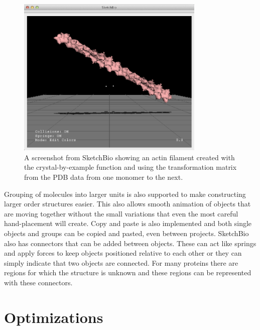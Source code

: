 \documentclass{article} %
\begin{document}
\begin{figure}[h]
\centering
\includegraphics[width=0.8\textwidth]{crystal_actin.png}
\caption{A screenshot from SketchBio showing an actin filament created with the crystal-by-example function and using the transformation matrix from the PDB data from one monomer to the next.}
\label{fig:crystal_actin}
\end{figure}

Grouping of molecules into larger units is also supported to make constructing larger order structures easier.  This also allows smooth animation of objects that are moving together without the small variations that even the most careful hand-placement will create.  Copy and paste is also implemented and both single objects and groups can be copied and pasted, even between projects.  SketchBio also has connectors that can be added between objects.  These can act like springs and apply forces to keep objects positioned relative to each other or they can simply indicate that two objects are connected.  For many proteins there are regions for which the structure is unknown and these regions can be represented with these connectors.

\section{Optimizations}
\end{document}
